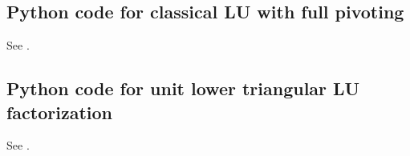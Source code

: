 \documentclass[10pt,twoside]{siamart1116}
\numberwithin{theorem}{section}
\begin{document}
\subsection{Python code for classical LU with full pivoting}\label{sec:python_full_pivoting}

See .



\subsection{Python code for unit lower triangular LU factorization}\label{sec:python_unit_lower}

See .



\clearpage
{} %


\end{document}
